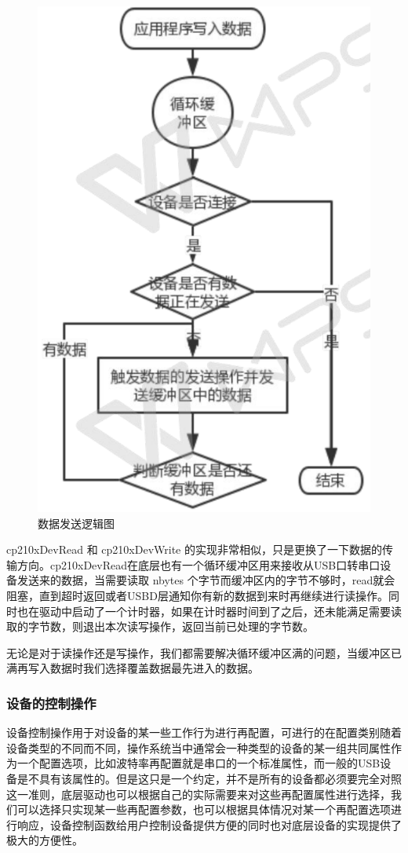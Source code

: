 \begin{figure}[!h]
\centering
\includegraphics[width=.7\textwidth]{./graphics/data-send-diagram.pdf}
\caption{数据发送逻辑图}\label{fig:outData-diagram}
\end{figure}


cp210xDevRead 和 cp210xDevWrite 的实现非常相似，只是更换了一下数据的传输方向。cp210xDevRead在底层也有一个循环缓冲区用来接收从USB口转串口设备发送来的数据，当需要读取 nbytes 个字节而缓冲区内的字节不够时，read就会阻塞，直到超时返回或者USBD层通知你有新的数据到来时再继续进行读操作。同时也在驱动中启动了一个计时器，如果在计时器时间到了之后，还未能满足需要读取的字节数，则退出本次读写操作，返回当前已处理的字节数。
	
	无论是对于读操作还是写操作，我们都需要解决循环缓冲区满的问题，当缓冲区已满再写入数据时我们选择覆盖数据最先进入的数据。


\subsubsection{设备的控制操作}
	设备控制操作用于对设备的某一些工作行为进行再配置，可进行的在配置类别随着设备类型的不同而不同，操作系统当中通常会一种类型的设备的某一组共同属性作为一个配置选项，比如波特率再配置就是串口的一个标准属性，而一般的USB设备是不具有该属性的。但是这只是一个约定，并不是所有的设备都必须要完全对照这一准则，底层驱动也可以根据自己的实际需要来对这些再配置属性进行选择，我们可以选择只实现某一些再配置参数，也可以根据具体情况对某一个再配置选项进行响应，设备控制函数给用户控制设备提供方便的同时也对底层设备的实现提供了极大的方便性。
	
